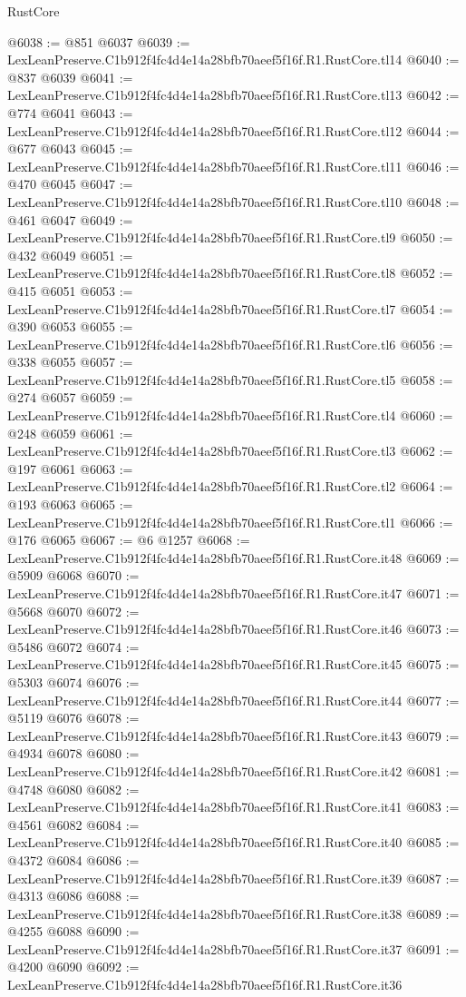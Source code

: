 \begin{lexlean}{RustCore}
\begin{coremodule}
@6038 := @851 @6037
@6039 := LexLeanPreserve.C1b912f4fc4d4e14a28bfb70aeef5f16f.R1.RustCore.tl14
@6040 := @837 @6039
@6041 := LexLeanPreserve.C1b912f4fc4d4e14a28bfb70aeef5f16f.R1.RustCore.tl13
@6042 := @774 @6041
@6043 := LexLeanPreserve.C1b912f4fc4d4e14a28bfb70aeef5f16f.R1.RustCore.tl12
@6044 := @677 @6043
@6045 := LexLeanPreserve.C1b912f4fc4d4e14a28bfb70aeef5f16f.R1.RustCore.tl11
@6046 := @470 @6045
@6047 := LexLeanPreserve.C1b912f4fc4d4e14a28bfb70aeef5f16f.R1.RustCore.tl10
@6048 := @461 @6047
@6049 := LexLeanPreserve.C1b912f4fc4d4e14a28bfb70aeef5f16f.R1.RustCore.tl9
@6050 := @432 @6049
@6051 := LexLeanPreserve.C1b912f4fc4d4e14a28bfb70aeef5f16f.R1.RustCore.tl8
@6052 := @415 @6051
@6053 := LexLeanPreserve.C1b912f4fc4d4e14a28bfb70aeef5f16f.R1.RustCore.tl7
@6054 := @390 @6053
@6055 := LexLeanPreserve.C1b912f4fc4d4e14a28bfb70aeef5f16f.R1.RustCore.tl6
@6056 := @338 @6055
@6057 := LexLeanPreserve.C1b912f4fc4d4e14a28bfb70aeef5f16f.R1.RustCore.tl5
@6058 := @274 @6057
@6059 := LexLeanPreserve.C1b912f4fc4d4e14a28bfb70aeef5f16f.R1.RustCore.tl4
@6060 := @248 @6059
@6061 := LexLeanPreserve.C1b912f4fc4d4e14a28bfb70aeef5f16f.R1.RustCore.tl3
@6062 := @197 @6061
@6063 := LexLeanPreserve.C1b912f4fc4d4e14a28bfb70aeef5f16f.R1.RustCore.tl2
@6064 := @193 @6063
@6065 := LexLeanPreserve.C1b912f4fc4d4e14a28bfb70aeef5f16f.R1.RustCore.tl1
@6066 := @176 @6065
@6067 := @6 @1257
@6068 := LexLeanPreserve.C1b912f4fc4d4e14a28bfb70aeef5f16f.R1.RustCore.it48
@6069 := @5909 @6068
@6070 := LexLeanPreserve.C1b912f4fc4d4e14a28bfb70aeef5f16f.R1.RustCore.it47
@6071 := @5668 @6070
@6072 := LexLeanPreserve.C1b912f4fc4d4e14a28bfb70aeef5f16f.R1.RustCore.it46
@6073 := @5486 @6072
@6074 := LexLeanPreserve.C1b912f4fc4d4e14a28bfb70aeef5f16f.R1.RustCore.it45
@6075 := @5303 @6074
@6076 := LexLeanPreserve.C1b912f4fc4d4e14a28bfb70aeef5f16f.R1.RustCore.it44
@6077 := @5119 @6076
@6078 := LexLeanPreserve.C1b912f4fc4d4e14a28bfb70aeef5f16f.R1.RustCore.it43
@6079 := @4934 @6078
@6080 := LexLeanPreserve.C1b912f4fc4d4e14a28bfb70aeef5f16f.R1.RustCore.it42
@6081 := @4748 @6080
@6082 := LexLeanPreserve.C1b912f4fc4d4e14a28bfb70aeef5f16f.R1.RustCore.it41
@6083 := @4561 @6082
@6084 := LexLeanPreserve.C1b912f4fc4d4e14a28bfb70aeef5f16f.R1.RustCore.it40
@6085 := @4372 @6084
@6086 := LexLeanPreserve.C1b912f4fc4d4e14a28bfb70aeef5f16f.R1.RustCore.it39
@6087 := @4313 @6086
@6088 := LexLeanPreserve.C1b912f4fc4d4e14a28bfb70aeef5f16f.R1.RustCore.it38
@6089 := @4255 @6088
@6090 := LexLeanPreserve.C1b912f4fc4d4e14a28bfb70aeef5f16f.R1.RustCore.it37
@6091 := @4200 @6090
@6092 := LexLeanPreserve.C1b912f4fc4d4e14a28bfb70aeef5f16f.R1.RustCore.it36

\end{coremodule}
\end{lexlean}
